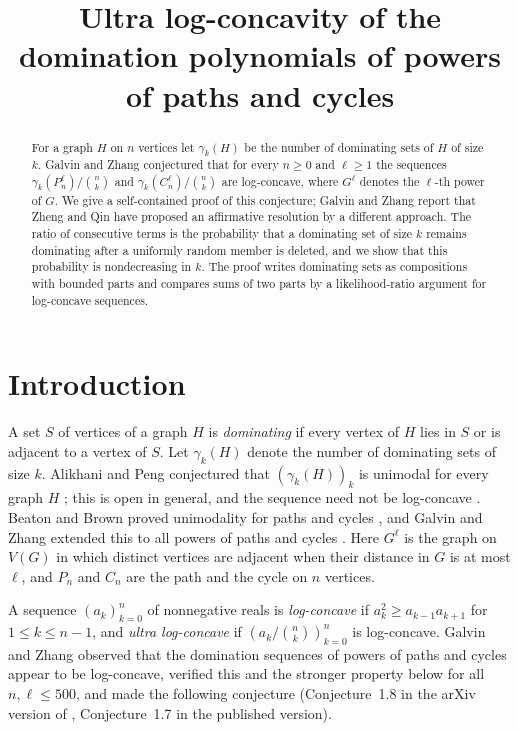 \documentclass[11pt,a4paper]{amsart}
\title{Ultra log-concavity of the domination polynomials of powers of paths and cycles}
\theoremstyle{definition}
\theoremstyle{remark}
\begin{document}
\begin{abstract}
For a graph $H$ on $n$ vertices let $\gamma_k(H)$ be the number of dominating sets of $H$ of size $k$.
Galvin and Zhang conjectured that for every $n\ge 0$ and $\ell\ge 1$ the sequences $\gamma_k(P_n^\ell)/\binom nk$ and $\gamma_k(C_n^\ell)/\binom nk$ are log-concave, where $G^\ell$ denotes the $\ell$-th power of $G$.
We give a self-contained proof of this conjecture; Galvin and Zhang report that Zheng and Qin have proposed an affirmative resolution by a different approach.
The ratio of consecutive terms is the probability that a dominating set of size $k$ remains dominating after a uniformly random member is deleted, and we show that this probability is nondecreasing in $k$.
The proof writes dominating sets as compositions with bounded parts and compares sums of two parts by a likelihood-ratio argument for log-concave sequences.
\end{abstract}

\maketitle

\section{Introduction}

A set $S$ of vertices of a graph $H$ is \emph{dominating} if every vertex of $H$ lies in $S$ or is adjacent to a vertex of $S$. Let $\gamma_k(H)$ denote the number of dominating sets of size $k$. Alikhani and Peng conjectured that $(\gamma_k(H))_k$ is unimodal for every graph $H$ \cite{AP}; this is open in general, and the sequence need not be log-concave \cite{BB}. Beaton and Brown proved unimodality for paths and cycles \cite{BB}, and Galvin and Zhang extended this to all powers of paths and cycles \cite[Theorem~1.4]{GZ}. Here $G^\ell$ is the graph on $V(G)$ in which distinct vertices are adjacent when their distance in $G$ is at most $\ell$, and $P_n$ and $C_n$ are the path and the cycle on $n$ vertices.

A sequence $(a_k)_{k=0}^n$ of nonnegative reals is \emph{log-concave} if $a_k^2\ge a_{k-1}a_{k+1}$ for $1\le k\le n-1$, and \emph{ultra log-concave} if $(a_k/\binom nk)_{k=0}^n$ is log-concave. Galvin and Zhang observed that the domination sequences of powers of paths and cycles appear to be log-concave, verified this and the stronger property below for all $n,\ell\le 500$, and made the following conjecture (Conjecture~1.8 in the arXiv version of \cite{GZ}, Conjecture~1.7 in the published version).
\end{document}
